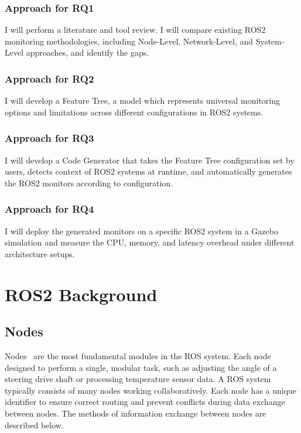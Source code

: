 \subsubsection{Approach for RQ1}
I will perform a literature and tool review. I will compare existing ROS2 monitoring methodologies, including Node-Level, Network-Level, and System-Level approaches, and identify the gaps.

\subsubsection{Approach for RQ2}
I will develop a Feature Tree, a model which represents universal monitoring options and limitations across different configurations in ROS2 systems.

\subsubsection{Approach for RQ3}
I will develop a Code Generator that takes the Feature Tree configuration set by users, detects context of ROS2 systems at runtime, and automatically generates the ROS2 monitors according to configuration.

\subsubsection{Approach for RQ4}
I will deploy the generated monitors on a specific ROS2 system in a Gazebo simulation and measure the CPU, memory, and latency overhead under different architecture setups.

\newpage

\section{ROS2 Background}
\label{ch:ros2background}

\subsection{Nodes}
Nodes~\cite{ros2nodes} are the most fundamental modules in the ROS system. Each node designed to perform a single, modular task, such as adjusting the angle of a steering drive shaft or processing temperature sensor data. A ROS system typically consists of many nodes working collaboratively. Each node has a unique identifier to ensure correct routing and prevent conflicts during data exchange between nodes. The methods of information exchange between nodes are described below.

